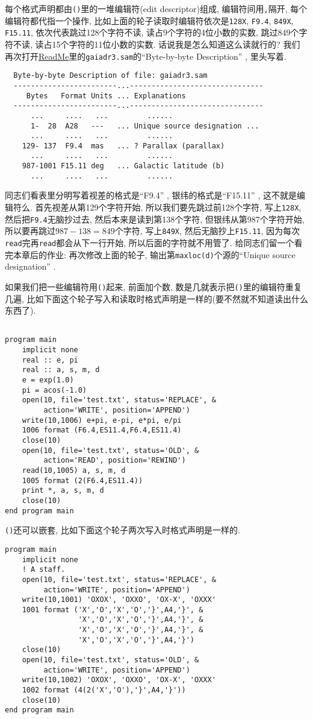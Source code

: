 每个格式声明都由\texttt{()}里的一堆编辑符(edit descriptor)组成, 编辑符间用\texttt{,}隔开, 每个编辑符都代指一个操作, 比如上面的轮子读取时编辑符依次是\texttt{128X}, \texttt{F9.4}, \texttt{849X}, \texttt{F15.11}, 依次代表跳过128个字符不读, 读占9个字符的4位小数的实数, 跳过849个字符不读, 读占15个字符的11位小数的实数. 话说我是怎么知道这么读就行的? 我们再次打开\href{https://cdsarc.cds.unistra.fr/viz-bin/ReadMe/I/355?format=html&tex=true}{ReadMe}里的\texttt{gaiadr3.sam}的``Byte-by-byte Description'' , 里头写着.
\begin{lstlisting}
  Byte-by-byte Description of file: gaiadr3.sam
  ------------------------...-------------------------------
     Bytes   Format Units ... Explanations
  ------------------------...-------------------------------
      ...     ....   ...         ......
      1-  28  A28   ---   ... Unique source designation ...
      ...     ....   ...         ......
    129- 137  F9.4  mas   ... ? Parallax (parallax)
      ...     ....   ...         ......
    987-1001 F15.11 deg   ... Galactic latitude (b)
      ...     ....   ...         ......
\end{lstlisting}
同志们看表里分明写着视差的格式是``F9.4'' , 银纬的格式是``F15.11'' , 这不就是编辑符么. 首先视差从第129个字符开始, 所以我们要先跳过前128个字符, 写上\texttt{128X}, 然后把\texttt{F9.4}无脑抄过去, 然后本来是读到第138个字符, 但银纬从第987个字符开始, 所以要再跳过$987-138=849$个字符, 写上\texttt{849X}, 然后无脑抄上\texttt{F15.11}, 因为每次\texttt{read}完再\texttt{read}都会从下一行开始, 所以后面的字符就不用管了. 给同志们留一个看完本章后的作业: 再次修改上面的轮子, 输出第\texttt{maxloc(d)}个源的``Unique source designation'' .

如果我们把一些编辑符用\texttt{()}起来, 前面加个数, 数是几就表示把\texttt{()}里的编辑符重复几遍, 比如下面这个轮子写入和读取时格式声明是一样的(要不然就不知道读出什么东西了).
\begin{lstlisting}

program main
    implicit none
    real :: e, pi
    real :: a, s, m, d
    e = exp(1.0)
    pi = acos(-1.0)
    open(10, file='test.txt', status='REPLACE', &
         action='WRITE', position='APPEND')
    write(10,1006) e+pi, e-pi, e*pi, e/pi
    1006 format (F6.4,ES11.4,F6.4,ES11.4)
    close(10)
    open(10, file='test.txt', status='OLD', &
         action='READ', position='REWIND')
    read(10,1005) a, s, m, d
    1005 format (2(F6.4,ES11.4))
    print *, a, s, m, d
    close(10)
end program main
\end{lstlisting}
\texttt{()}还可以嵌套, 比如下面这个轮子两次写入时格式声明是一样的.
\begin{lstlisting}
program main
    implicit none
    ! A staff.
    open(10, file='test.txt', status='REPLACE', &
         action='WRITE', position='APPEND')
    write(10,1001) 'OXOX', 'OXXO', 'OX-X', 'OXXX'
    1001 format ('X','O','X','O','}',A4,'}', &
                 'X','O','X','O','}',A4,'}', &
                 'X','O','X','O','}',A4,'}', &
                 'X','O','X','O','}',A4,'}')
    close(10)
    open(10, file='test.txt', status='OLD', &
         action='WRITE', position='APPEND')
    write(10,1002) 'OXOX', 'OXXO', 'OX-X', 'OXXX'
    1002 format (4(2('X','O'),'}',A4,'}'))
    close(10)
end program main
\end{lstlisting}


